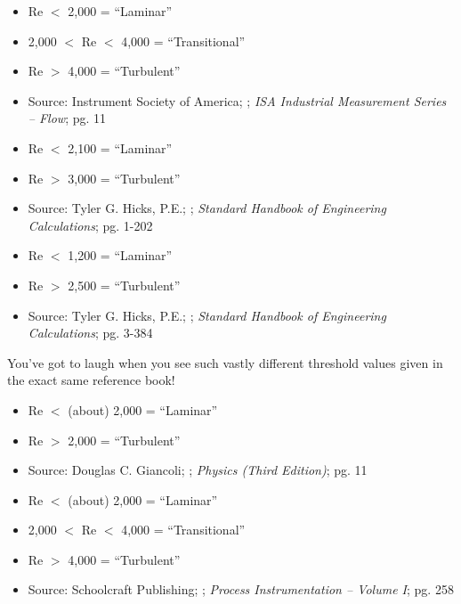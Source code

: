 \begin{itemize}
\goodbreak
\item{} Re $<$ 2,000 = ``Laminar''
\item{} 2,000 $<$ Re $<$ 4,000 = ``Transitional''
\item{} Re $>$ 4,000 = ``Turbulent''
\item{} Source: Instrument Society of America; ; {\it ISA Industrial Measurement Series -- Flow}; pg. 11
\end{itemize}

\begin{itemize}
\goodbreak
\item{} Re $<$ 2,100 = ``Laminar''
\item{} Re $>$ 3,000 = ``Turbulent''
\item{} Source: Tyler G. Hicks, P.E.; ; {\it Standard Handbook of Engineering Calculations}; pg. 1-202
\end{itemize}

\begin{itemize}
\goodbreak
\item{} Re $<$ 1,200 = ``Laminar''
\item{} Re $>$ 2,500 = ``Turbulent''
\item{} Source: Tyler G. Hicks, P.E.; ; {\it Standard Handbook of Engineering Calculations}; pg. 3-384
\end{itemize}

You've got to laugh when you see such vastly different threshold values given in the exact same reference book!

\begin{itemize}
\goodbreak
\item{} Re $<$ (about) 2,000 = ``Laminar''
\item{} Re $>$ 2,000 = ``Turbulent''
\item{} Source: Douglas C. Giancoli; ; {\it Physics (Third Edition)}; pg. 11
\end{itemize}

\begin{itemize}
\goodbreak
\item{} Re $<$ (about) 2,000 = ``Laminar''
\item{} 2,000 $<$ Re $<$ 4,000 = ``Transitional''
\item{} Re $>$ 4,000 = ``Turbulent''
\item{} Source: Schoolcraft Publishing; ; {\it Process Instrumentation -- Volume I}; pg. 258
\end{itemize}

